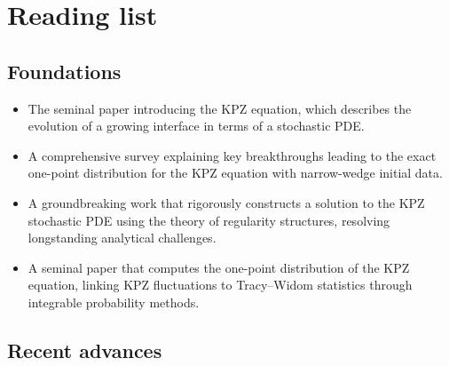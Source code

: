 \documentclass[10pt]{article}
\numberwithin{equation}{section}
\theoremstyle{plain}
\theoremstyle{plain}
\theoremstyle{definition}
\begin{document}
\section*{Reading list}
\subsection*{Foundations}
\begin{itemize}

	\item \cite{KPZ1986} The seminal paper introducing the KPZ equation, which describes the evolution of a growing interface in terms of a stochastic PDE.

\item
	\cite{CorwinKPZ} A comprehensive survey explaining key breakthroughs leading to the exact one-point distribution for the KPZ equation with narrow-wedge initial data.

\item \cite{Hairer11}
    A groundbreaking work that rigorously constructs a solution to the KPZ stochastic PDE using the theory of regularity structures, resolving longstanding analytical challenges.

	\item \cite{AmirCorwinQuastel2011}
    A seminal paper that computes the one-point distribution of the KPZ equation, linking KPZ fluctuations to Tracy--Widom statistics through integrable probability methods.
\end{itemize}

\subsection*{Recent advances}
\end{document}
